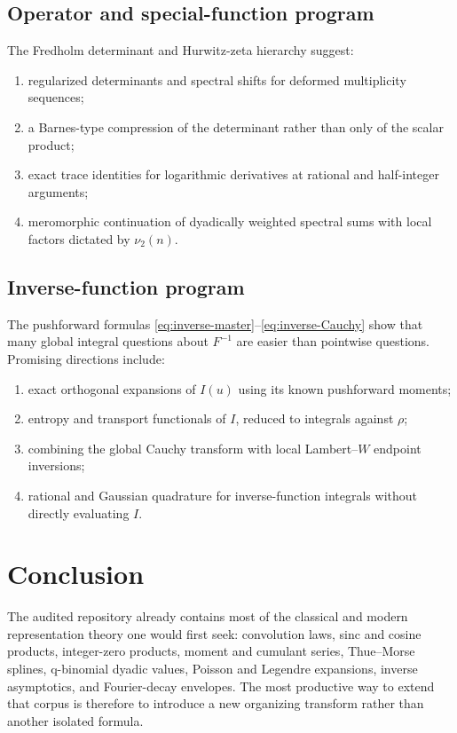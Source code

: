 \documentclass[11pt]{article}
\theoremstyle{definition}
\theoremstyle{remark}
\begin{document}
\subsection{Operator and special-function program}

The Fredholm determinant and Hurwitz-zeta hierarchy suggest:

\begin{enumerate}
\item regularized determinants and spectral shifts for deformed multiplicity sequences;
\item a Barnes-type compression of the determinant rather than only of the scalar product;
\item exact trace identities for logarithmic derivatives at rational and half-integer
      arguments;
\item meromorphic continuation of dyadically weighted spectral sums with local factors
      dictated by \(\nu_2(n)\).
\end{enumerate}

\subsection{Inverse-function program}

The pushforward formulas \eqref{eq:inverse-master}--\eqref{eq:inverse-Cauchy} show that
many global integral questions about \(F^{-1}\) are easier than pointwise questions.
Promising directions include:

\begin{enumerate}
\item exact orthogonal expansions of \(I(u)\) using its known pushforward moments;
\item entropy and transport functionals of \(I\), reduced to integrals against \(\rho\);
\item combining the global Cauchy transform with local Lambert--\(W\) endpoint inversions;
\item rational and Gaussian quadrature for inverse-function integrals without directly
      evaluating \(I\).
\end{enumerate}

\section{Conclusion}

The audited repository already contains most of the classical and modern representation
theory one would first seek: convolution laws, sinc and cosine products, integer-zero
products, moment and cumulant series, Thue--Morse splines, q-binomial dyadic values,
Poisson and Legendre expansions, inverse asymptotics, and Fourier-decay envelopes.  The
most productive way to extend that corpus is therefore to introduce a new organizing
transform rather than another isolated formula.
\end{document}
